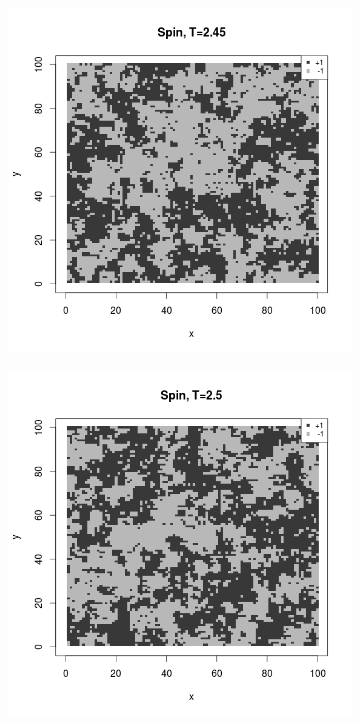 \documentclass{scrartcl}
\begin{document}
\begin{figure}[ht]
\begin{subfigure}{.35\textwidth}
\end{subfigure}%
\begin{subfigure}{.35\textwidth}
  \centering
  \includegraphics[width=1\linewidth]{spins/spinT2_45}
\end{subfigure}
\begin{subfigure}{.35\textwidth}
  \centering
  \includegraphics[width=1\linewidth]{spins/spinT2_5}

\end{subfigure}
\end{figure}
\end{document}
